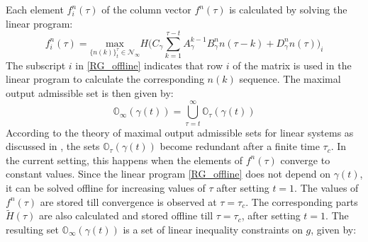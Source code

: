 \documentclass[letterpaper, 10 pt, conference]{ieeeconf}  %
\begin{document}
	Each element $f^n_i(\tau)$ of the column vector $f^n(\tau)$ is calculated by solving the linear program:
	\begin{equation}
	f_i^n(\tau) = \underset{\{n(k)\}_{t}^{\tau}\in \mathcal{N}_{\infty}}{\text{max}} H\bigg(C_{\gamma}\sum\limits_{k=1}^{\tau - t}A_{\gamma}^{k-1}B^n_{\gamma}n(\tau-k) + D_{\gamma}^n n(\tau)\bigg)_i
	\label{RG_offline}
	\end{equation}
	The subscript $i$ in \eqref{RG_offline} indicates that row $i$ of the matrix is used in the linear program to calculate the corresponding $n(k)$ sequence. The maximal output admissible set is then given by:
	\begin{equation}
	\mathbb{O}_{\infty}(\gamma(t)) = \bigcup\limits_{\tau=t}^{\infty}\mathbb{O}_{\tau}(\gamma(t))
	\end{equation}
	 According to the theory of maximal output admissible sets for linear systems as discussed in \cite{83532}, the sets $\mathbb{O}_{\tau}(\gamma(t))$ become redundant after a finite time $\tau_c$. In the current setting, this happens when the elements of $f^n(\tau)$ converge to constant values.
	 Since the linear program \eqref{RG_offline} does not depend on $\gamma(t)$, it can be solved offline for increasing values of $\tau$ after setting $t=1$. The values of $f^n(\tau)$ are stored till convergence is observed at $\tau = \tau_c$. The corresponding parts $\tilde{H}(\tau)$ are also calculated and stored offline till $\tau = \tau_c$, after setting $t=1$. The resulting set $\mathbb{O}_{\infty}(\gamma(t))$ is a set of linear inequality constraints on $g$, given by:
\end{document}
